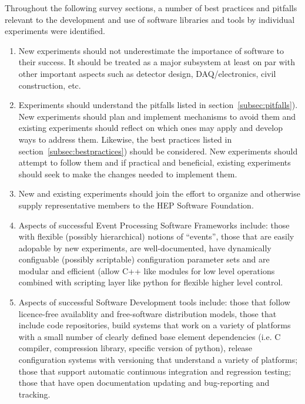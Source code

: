 Throughout the following survey sections, a number of best practices
and pitfalls relevant to the development and use of software libraries
and tools by individual experiments were identified.

\begin{enumerate}

\item New experiments should not underestimate the importance of
  software to their success.  It should be treated as a major
  subsystem at least on par with other important aspects such as
  detector design, DAQ/electronics, civil construction, etc.

\item Experiments should understand the pitfalls listed in
  section~\ref{subsec:pitfalls}).  New experiments should plan and
  implement mechanisms to avoid them and existing experiments should
  reflect on which ones may apply and develop ways to address them.
  Likewise, the best practices listed in
  section~\ref{subsec:bestpractices}) should be considered.  New
  experiments should attempt to follow them and if practical and
  beneficial, existing experiments should seek to make the changes
  needed to implement them.

\item New and existing experiments should join the effort to organize
  and otherwise supply representative members to the HEP Software
  Foundation.

\item Aspects of successful Event Processing Software Frameworks include: 
those with flexible (possibly hierarchical) notions of ``events'', 
those that are easily adopable by new experiments, are well-documented, 
have dynamically configuable (possibly scriptable) configuration 
parameter sets and are modular and efficient (allow C++ like modules 
for low level 
operations combined with scripting layer like python for flexible 
higher level control.

\item Aspects of successful Software Development tools include:
those that follow licence-free availablity and free-software distribution models, those that include code repositories, build systems that work on a variety of platforms with a small number of clearly defined base element dependencies 
(i.e. C compiler, compression library, specific version of python), release 
configuration systems with versioning that understand a variety of 
platforms; those that support automatic continuous integration and 
regression testing; those that have open documentation updating and  
bug-reporting and tracking.


\end{enumerate}
